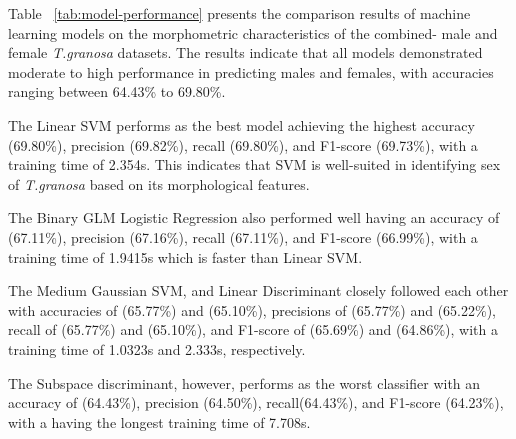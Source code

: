 \begin{table}[H]
	\centering
	\caption{Model Performance Comparison}
	\label{tab:model-performance}
\end{table}

Table ~\ref{tab:model-performance} presents the comparison results of machine learning models on the morphometric characteristics of the combined- male and female \textit{T.granosa} datasets. The results indicate that all models demonstrated moderate to high performance in predicting males and females, with accuracies ranging between 64.43\% to 69.80\%. 

The Linear SVM performs as the best model achieving the highest accuracy (69.80\%), precision (69.82\%), recall (69.80\%), and F1-score (69.73\%), with a training time of 2.354s. This indicates that SVM is well-suited in identifying sex of \textit{T.granosa} based on its morphological features. 

The Binary GLM Logistic Regression also performed well having an accuracy of (67.11\%), precision (67.16\%), recall (67.11\%), and F1-score (66.99\%), with a training time of 1.9415s which is faster than Linear SVM. 

The Medium Gaussian SVM, and Linear Discriminant closely followed each other with accuracies of (65.77\%) and (65.10\%), precisions of (65.77\%) and (65.22\%), recall of (65.77\%) and (65.10\%), and F1-score of (65.69\%) and (64.86\%), with a training time of 1.0323s and 2.333s, respectively. 

The Subspace discriminant, however, performs as the worst classifier with an accuracy of (64.43\%), precision (64.50\%), recall(64.43\%), and F1-score (64.23\%), with a having the longest training time of 7.708s. 

